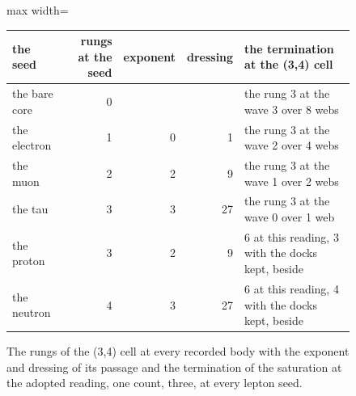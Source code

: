 \begin{figure}[h]\centering
\begin{adjustbox}{max width=\linewidth}\begin{tabular}{lrrrl}\toprule
the seed & rungs at the seed & exponent & dressing & the termination at the (3,4) cell \\ \midrule
the bare core & 0 & & & the rung 3 at the wave 3 over 8 webs \\
the electron & 1 & 0 & 1 & the rung 3 at the wave 2 over 4 webs \\
the muon & 2 & 2 & 9 & the rung 3 at the wave 1 over 2 webs \\
the tau & 3 & 3 & 27 & the rung 3 at the wave 0 over 1 web \\
the proton & 3 & 2 & 9 & 6 at this reading, 3 with the docks kept, beside \\
the neutron & 4 & 3 & 27 & 6 at this reading, 4 with the docks kept, beside \\ \bottomrule
\end{tabular}\end{adjustbox}
\caption{The rungs of the (3,4) cell at every recorded body with the exponent and dressing of its passage and the termination of the saturation at the adopted reading, one count, three, at every lepton seed.}
\end{figure}
